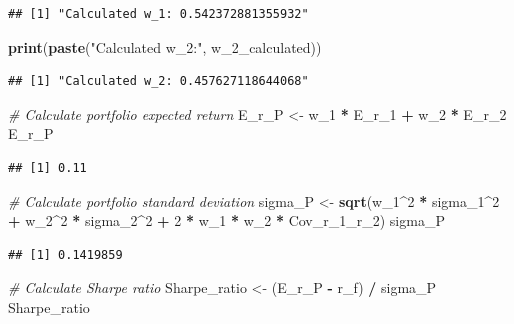 \documentclass[
]{book}
\newenvironment{Shaded}{\begin{snugshade}}{\end{snugshade}}
\newcommand{\CommentTok}[1]{\textcolor[rgb]{0.56,0.35,0.01}{\textit{#1}}}
\newcommand{\DecValTok}[1]{\textcolor[rgb]{0.00,0.00,0.81}{#1}}
\newcommand{\FunctionTok}[1]{\textcolor[rgb]{0.13,0.29,0.53}{\textbf{#1}}}
\newcommand{\NormalTok}[1]{#1}
\newcommand{\OtherTok}[1]{\textcolor[rgb]{0.56,0.35,0.01}{#1}}
\newcommand{\SpecialCharTok}[1]{\textcolor[rgb]{0.81,0.36,0.00}{\textbf{#1}}}
\newcommand{\StringTok}[1]{\textcolor[rgb]{0.31,0.60,0.02}{#1}}
\begin{document}
\begin{verbatim}
## [1] "Calculated w_1: 0.542372881355932"
\end{verbatim}

\begin{Shaded}
\begin{Highlighting}[]
\FunctionTok{print}\NormalTok{(}\FunctionTok{paste}\NormalTok{(}\StringTok{"Calculated w\_2:"}\NormalTok{, w\_2\_calculated))}
\end{Highlighting}
\end{Shaded}

\begin{verbatim}
## [1] "Calculated w_2: 0.457627118644068"
\end{verbatim}

\begin{Shaded}
\begin{Highlighting}[]
\CommentTok{\# Calculate portfolio expected return}
\NormalTok{E\_r\_P }\OtherTok{\textless{}{-}}\NormalTok{ w\_1 }\SpecialCharTok{*}\NormalTok{ E\_r\_1 }\SpecialCharTok{+}\NormalTok{ w\_2 }\SpecialCharTok{*}\NormalTok{ E\_r\_2}
\NormalTok{E\_r\_P}
\end{Highlighting}
\end{Shaded}

\begin{verbatim}
## [1] 0.11
\end{verbatim}

\begin{Shaded}
\begin{Highlighting}[]
\CommentTok{\# Calculate portfolio standard deviation}
\NormalTok{sigma\_P }\OtherTok{\textless{}{-}} \FunctionTok{sqrt}\NormalTok{(w\_1}\SpecialCharTok{\^{}}\DecValTok{2} \SpecialCharTok{*}\NormalTok{ sigma\_1}\SpecialCharTok{\^{}}\DecValTok{2} \SpecialCharTok{+}\NormalTok{ w\_2}\SpecialCharTok{\^{}}\DecValTok{2} \SpecialCharTok{*}\NormalTok{ sigma\_2}\SpecialCharTok{\^{}}\DecValTok{2} \SpecialCharTok{+} \DecValTok{2} \SpecialCharTok{*}\NormalTok{ w\_1 }\SpecialCharTok{*}\NormalTok{ w\_2 }\SpecialCharTok{*}\NormalTok{ Cov\_r\_1\_r\_2)}
\NormalTok{sigma\_P}
\end{Highlighting}
\end{Shaded}

\begin{verbatim}
## [1] 0.1419859
\end{verbatim}

\begin{Shaded}
\begin{Highlighting}[]
\CommentTok{\# Calculate Sharpe ratio}
\NormalTok{Sharpe\_ratio }\OtherTok{\textless{}{-}}\NormalTok{ (E\_r\_P }\SpecialCharTok{{-}}\NormalTok{ r\_f) }\SpecialCharTok{/}\NormalTok{ sigma\_P}
\NormalTok{Sharpe\_ratio}
\end{Highlighting}
\end{Shaded}
\end{document}
